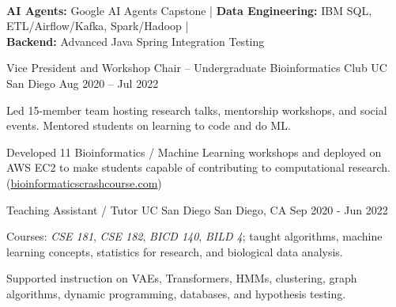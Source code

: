 \documentclass[11pt, a4paper]{awesome-cv}
\begin{document}
\begin{cventries}
\cventry
{~}{~}{~}{~}
{
\begin{cvitems}
\item {\textbf{AI Agents:} Google AI Agents Capstone \quad | \quad \textbf{Data Engineering:} IBM SQL, ETL/Airflow/Kafka, Spark/Hadoop \quad | \quad \\ \textbf{Backend:} Advanced Java Spring Integration Testing}
\end{cvitems}
}
\end{cventries}

\begin{cventries}
  \cventry
    {Vice President and Workshop Chair – Undergraduate Bioinformatics Club}
    {UC San Diego}
    {}
    {Aug 2020 – Jul 2022}
    {
      \begin{cvitems}
        \item {Led 15-member team hosting research talks, mentorship workshops, and social events. Mentored students on learning to code and do ML.}
        \item {Developed 11 Bioinformatics / Machine Learning workshops and deployed on AWS EC2 to make students capable of contributing to computational research.
        (\href{bioinformaticscrashcourse.com}{bioinformaticscrashcourse.com})}
      \end{cvitems}
    }

\cventry
{Teaching Assistant / Tutor}
{UC San Diego}
{San Diego, CA}
{Sep 2020 - Jun 2022}
{
\begin{cvitems}
\item {Courses: \textit{CSE 181}, \textit{CSE 182}, \textit{BICD 140}, \textit{BILD 4}; taught algorithms, machine learning concepts, statistics for research, and biological data analysis.}
\item {Supported instruction on VAEs, Transformers, HMMs, clustering, graph algorithms, dynamic programming, databases, and hypothesis testing.}
\end{cvitems}
}
\end{cventries}

\end{document}
